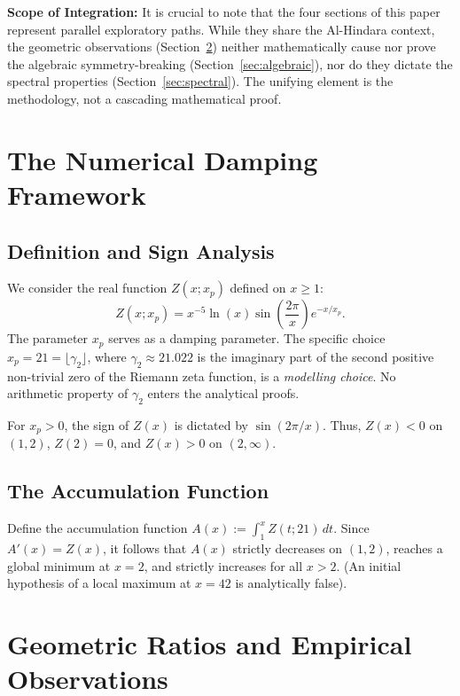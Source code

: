 \documentclass[11pt,a4paper]{article}
\begin{document}
\textbf{Scope of Integration:} It is crucial to note that the four sections of this paper represent parallel exploratory paths. While they share the Al-Hindara context, the geometric observations (Section~\ref{sec:geometric}) neither mathematically cause nor prove the algebraic symmetry-breaking (Section~\ref{sec:algebraic}), nor do they dictate the spectral properties (Section~\ref{sec:spectral}). The unifying element is the methodology, not a cascading mathematical proof.

\section{The Numerical Damping Framework}
\label{sec:numerical}

\subsection{Definition and Sign Analysis}
We consider the real function \(Z(x; x_p)\) defined on \(x \ge 1\):
\begin{equation}
\label{eq:Z}
Z(x; x_p) = x^{-5} \ln(x) \sin\left(\frac{2\pi}{x}\right) e^{-x/x_p}.
\end{equation}
The parameter \(x_p\) serves as a damping parameter. The specific choice \(x_p = 21 = \lfloor \gamma_2 \rfloor\), where \(\gamma_2 \approx 21.022\) is the imaginary part of the second positive non-trivial zero of the Riemann zeta function, is a \emph{modelling choice}. No arithmetic property of \(\gamma_2\) enters the analytical proofs.

For \(x_p > 0\), the sign of \(Z(x)\) is dictated by \(\sin(2\pi/x)\). Thus, \(Z(x) < 0\) on \((1, 2)\), \(Z(2) = 0\), and \(Z(x) > 0\) on \((2, \infty)\).

\subsection{The Accumulation Function}
Define the accumulation function \(A(x) := \int_1^x Z(t; 21) \, dt\). Since \(A'(x) = Z(x)\), it follows that \(A(x)\) strictly decreases on \((1, 2)\), reaches a global minimum at \(x = 2\), and strictly increases for all \(x > 2\). (An initial hypothesis of a local maximum at \(x = 42\) is analytically false).

\section{Geometric Ratios and Empirical Observations}
\label{sec:geometric}
\end{document}
